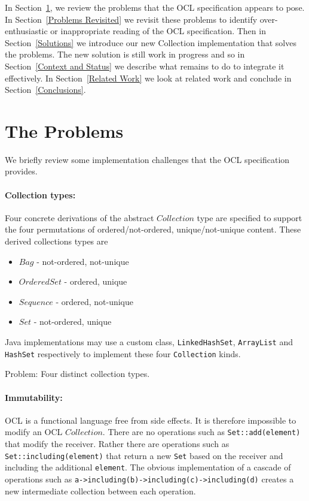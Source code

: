 \documentclass{llncs}
\begin{document}
In Section~\ref{Problems}, we review the problems that the OCL specification appears to pose. In Section~\ref{Problems Revisited} we revisit these problems to identify over-enthusiastic or inappropriate reading of the OCL specification. Then in Section~\ref{Solutions} we introduce our new Collection implementation that solves the problems. The new solution is still work in progress and so in Section~\ref{Context and Status} we describe what remains to do to integrate it effectively. In Section~\ref{Related Work} we look at related work and conclude in Section~\ref{Conclusions}.
 
\section{The Problems}\label{Problems}

We briefly review some implementation challenges that the OCL specification provides.

\paragraph{Collection types:}

Four concrete derivations of the abstract $Collection$ type are specified to support the four permutations of ordered/not-ordered, unique/not-unique content. These derived collections types are

\begin{itemize}
	\item $Bag$ - not-ordered, not-unique
	\item $OrderedSet$ - ordered, unique
	\item $Sequence$ - ordered, not-unique
	\item $Set$ - not-ordered, unique
\end{itemize}

Java implementations may use a custom class, \verb$LinkedHashSet$, \verb$ArrayList$ and \verb$HashSet$ respectively to implement these four \verb$Collection$ kinds.

Problem: Four distinct collection types.

\paragraph{Immutability:}

OCL is a functional language free from side effects. It is therefore impossible to modify an OCL $Collection$. There are no operations such as \verb$Set::add(element)$ that modify the receiver. Rather there are operations such as \verb$Set::including(element)$ that return a new \verb$Set$ based on the receiver and including the additional \verb$element$. The obvious implementation of a cascade of operations such as \verb$a->including(b)->including(c)->including(d)$ creates a new intermediate collection between each operation.
\end{document}

